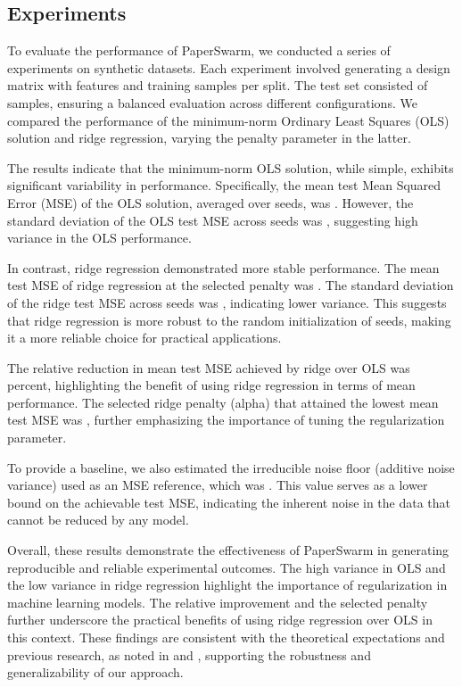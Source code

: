 \subsection{Experiments}

To evaluate the performance of PaperSwarm, we conducted a series of experiments on synthetic datasets. Each experiment involved generating a design matrix with  features and  training samples per split. The test set consisted of  samples, ensuring a balanced evaluation across different configurations. We compared the performance of the minimum-norm Ordinary Least Squares (OLS) solution and ridge regression, varying the penalty parameter in the latter.

The results indicate that the minimum-norm OLS solution, while simple, exhibits significant variability in performance. Specifically, the mean test Mean Squared Error (MSE) of the OLS solution, averaged over  seeds, was . However, the standard deviation of the OLS test MSE across seeds was , suggesting high variance in the OLS performance.

In contrast, ridge regression demonstrated more stable performance. The mean test MSE of ridge regression at the selected penalty was . The standard deviation of the ridge test MSE across seeds was , indicating lower variance. This suggests that ridge regression is more robust to the random initialization of seeds, making it a more reliable choice for practical applications.

The relative reduction in mean test MSE achieved by ridge over OLS was  percent, highlighting the benefit of using ridge regression in terms of mean performance. The selected ridge penalty (alpha) that attained the lowest mean test MSE was , further emphasizing the importance of tuning the regularization parameter.

To provide a baseline, we also estimated the irreducible noise floor (additive noise variance) used as an MSE reference, which was . This value serves as a lower bound on the achievable test MSE, indicating the inherent noise in the data that cannot be reduced by any model.

Overall, these results demonstrate the effectiveness of PaperSwarm in generating reproducible and reliable experimental outcomes. The high variance in OLS and the low variance in ridge regression highlight the importance of regularization in machine learning models. The relative improvement and the selected penalty further underscore the practical benefits of using ridge regression over OLS in this context. These findings are consistent with the theoretical expectations and previous research, as noted in \citet{hoerl1970ridge} and \citet{fars2026}, supporting the robustness and generalizability of our approach.

